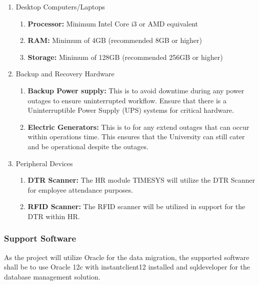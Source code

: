         \begin{enumerate}
            \item Desktop Computers/Laptops
            \begin{enumerate}
                \item \textbf{Processor:} Minimum Intel Core i3 or AMD equivalent
                \item \textbf{RAM:} Minimum of 4GB (recommended 8GB or higher)
                \item \textbf{Storage:} Minimum of 128GB (recommended 256GB or higher)
            \end{enumerate}
            
            \item Backup and Recovery Hardware
            \begin{enumerate}
                \item \textbf{Backup Power supply:} This is to avoid downtime during any power outages to ensure uninterrupted workflow. Ensure that there is a Uninterruptible Power Supply (UPS) systems for critical hardware.
                
                \item \textbf{Electric Generators:} This is to for any extend outages that can occur within operations time. This ensures that the University can still cater and be operational despite the outages.
            \end{enumerate}
            
            \item Peripheral Devices
            \begin{enumerate}
                \item \textbf{DTR Scanner:} The HR module TIMESYS will utilize the DTR Scanner for employee attendance purposes.
                \item \textbf{RFID Scanner:} The RFID scanner will be utilized in support for the DTR within HR.
            \end{enumerate}
            
        \end{enumerate}

        \subsubsection{Support Software}

        As the project will utilize Oracle for the data migration, the supported software shall be to use Oracle 12c with instantclient12 installed and sqldeveloper for the database management solution. 
        \\

